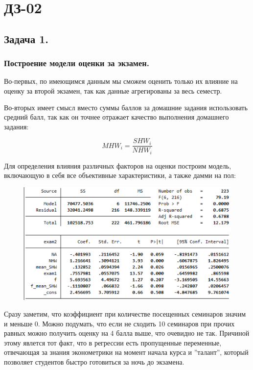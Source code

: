 \documentclass[12pt,a4paper, oneside]{extreport}
\begin{document}



\chapter{ДЗ-02}


\section{Задача 1.}


\subsection{Построение модели оценки за экзамен.}

Во-первых, по имеющимся данным мы сможем оценить только их влияние на оценку за второй экзамен, так как данные агрегированы за весь семестр.

Во-вторых имеет смысл вместо суммы баллов за домашние задания использовать средний балл, так как он точнее отражает качество выполнения домашнего задания:

\begin{equation}\label{key}
MHW_i = \dfrac{SHW_i}{NHW_i}
\end{equation}

Для определения влияния различных факторов на оценки построим модель, включающую в себя все объективные характеристики, а также дамми на пол: 

\begin{figure}[h!]
	\centering
	\includegraphics[width=0.7\linewidth]{screenshot001}
	\label{fig:screenshot001}
\end{figure}

Сразу заметим, что коэффициент при количестве посещенных семинаров значим и меньше 0. Можно подумать, что если не сходить 10 семинаров при прочих равных можно получить оценку на 4 балла выше, что очевидно не так. Причиной этому явлется тот факт, что в регрессии есть пропущенные переменные, отвечающая за знания эконометрики на момент начала курса и  ''талант'', который позволяет студентов быстро готовиться за ночь до экзамена. 
\end{document}

